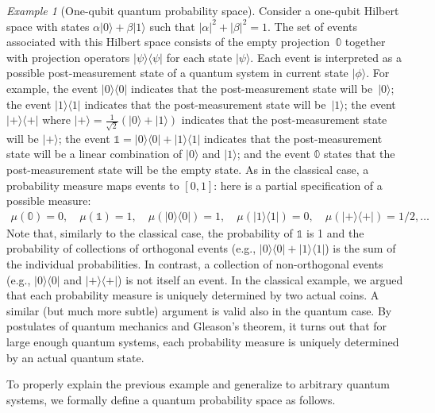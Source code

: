 \documentclass{article}
\theoremstyle{remark}
\newtheorem{example}{Example}
\newcommand{\ket}[1]{|#1\rangle}
\newcommand{\proj}[1]{|#1 \rangle\langle #1 |}
\newcommand{\ps}{\texttt{+}}
\begin{document}
\begin{example}[One-qubit quantum probability space] 
  Consider a one-qubit Hilbert space with states
  $\alpha \ket{0} + \beta \ket{1}$ such that
  $|\alpha|^2 + |\beta|^2 = 1$. The set of events associated with this
  Hilbert space consists of the empty projection~$\mathbb{0}$ together 
  with projection operators $\proj{\psi}$ for each state $\ket{\psi}$.
  Each event is interpreted as a possible post-measurement state of a
  quantum system in current state $\ket{\phi}$. For example, the event
  $\proj{0}$ indicates that the post-measurement state will
  be~$\ket{0}$; the event $\proj{1}$ indicates that the
  post-measurement state will be~$\ket{1}$; the event $\proj{\ps}$
  where $\ket{\ps} = \frac{1}{\sqrt{2}}(\ket{0}+\ket{1})$ indicates
  that the post-measurement state will be $\ket{\ps}$; the event
  $\mathbb{1} = \proj{0}+\proj{1}$ indicates that the post-measurement
  state will be a linear combination of $\ket{0}$ and $\ket{1}$; and
  the event $\mathbb{0}$ states that the post-measurement state will
  be the empty state. As in the classical case, a probability measure
  maps events to $[0,1]$: here is a partial specification of a
  possible measure:
\[\begin{array}{rcl}
\mu\left(\mathbb{0}\right) = 0, \quad
\mu\left(\mathbb{1}\right) =  1, \quad
\mu\left(\proj{0}\right) = 1, \quad
\mu\left(\proj{1}\right) = 0, \quad
\mu\left(\proj{\ps}\right) = 1/2, \ldots
\end{array}\]
Note that, similarly to the classical case, the probability of
$\mathbb{1}$ is 1 and the probability of collections of orthogonal
events (e.g., $\proj{0}+\proj{1}$) is the sum of the individual
probabilities. In contrast, a collection of non-orthogonal events
(e.g., $\proj{0}$ and $\proj{\ps}$) is not itself an event.
In the classical example, we argued that each probability measure is
uniquely determined by two actual coins. A similar (but much more
subtle) argument is valid also in the quantum case. By postulates of
quantum mechanics and Gleason's theorem, it turns out that for large
enough quantum systems, each probability measure is uniquely
determined by an actual quantum state.
\end{example}

To properly explain the previous example and generalize to arbitrary
quantum systems, we formally define a quantum probability space as
follows.
\end{document}
